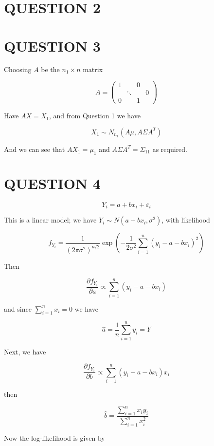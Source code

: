 \documentclass[a4paper]{article}
\begin{document}
\section{QUESTION 2}





\section{QUESTION 3}

Choosing $ A $ be the $ n_{1} \times n $ matrix 

\[ A = \begin{pmatrix}
1 & & 0 & \\
& \ddots & & 0 \\
0 & & 1 & 
\end{pmatrix} \]

Have $ A X = X_{1} $, and from Question 1 we have

\[ X_{1} \sim N_{n_{1}}( A \mu, A \Sigma A^{T})  \]

And we can see that $ A X_{1} = \mu_{1} $ and $ A \Sigma A^{T}  = \Sigma_{11} $ as required. 


\section{QUESTION 4}


\[ Y_{i} = a + b x_{i} + \varepsilon_{i} \]

This is a linear model; we have $ Y_{i} \sim N(a + bx_{i}, \sigma^{2}) $, with likelihood

\[ f_{Y_{i}} = \frac{1}{(2 \pi \sigma^{2})^{n /2}}  \exp \left(  - \frac{1}{2 \sigma^{2}} \sum_{i=1}^{n} ( y_{i} - a - bx_{i})^{2} \right)  \]

Then

\[ \frac{\partial f_{Y_{i}} }{\partial a} \propto \sum_{i=1}^{n} ( y_{i} - a - bx_{i})  \]

and since $ \sum_{i=1}^{n} x_{i} = 0 $ we have 

\[ \hat{a} = \frac{1}{n} \sum_{i=1}^{n} y_{i} = \bar{Y}  \]

Next, we have 

\[ \frac{\partial f_{Y_{i}} }{\partial b} \propto \sum_{i=1}^{n} ( y_{i} - a - bx_{i})x_{i}  \]

then

\[ \hat{b} = \frac{\sum_{i=1}^{n} x_{i}y_{i} }{\sum_{i=1}^{n} x_{i}^{2} } \]

Now the log-likelihood is given by
\end{document}
